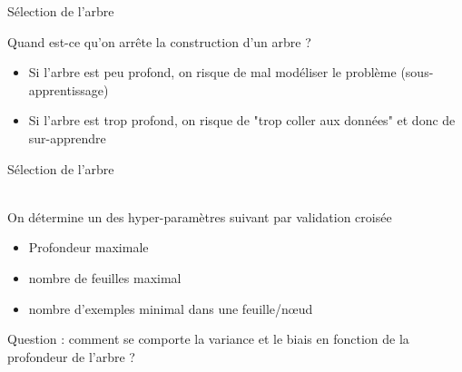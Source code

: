 \documentclass[10pt]{beamer}
\begin{document}


\begin{frame}{Sélection de l'arbre}
	
	\begin{vblock}{}\centering
	Quand est-ce qu'on arrête la construction d'un arbre ?
\end{vblock}
	
	
	\vspace*{2em}
	\begin{itemize}
		\item Si l'arbre est peu profond, on risque de mal modéliser le problème (sous-apprentissage)\\[1em]
		\item Si l'arbre est trop profond, on risque de "trop coller aux données" et donc de sur-apprendre
	\end{itemize}
\end{frame}


\begin{frame}{Sélection de l'arbre }
	
\\[2em]

On détermine un des hyper-paramètres suivant par validation
croisée\\[1em]

\begin{itemize}
	\item Profondeur maximale\\[0.5em]
	\item nombre de feuilles maximal\\[0.5em]
	\item nombre d’exemples minimal dans une feuille/nœud
\end{itemize}
\vspace*{2em}
Question : comment se comporte la variance et le biais en fonction de la profondeur de l'arbre ?
\vspace*{2em}
\end{frame}

\end{document}
